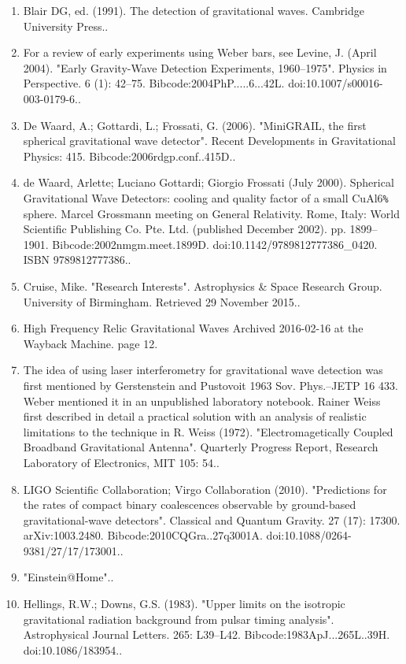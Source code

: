 \begin{enumerate}
\item Blair DG, ed. (1991). The detection of gravitational waves. Cambridge University Press..
\item For a review of early experiments using Weber bars, see Levine, J. (April 2004). "Early Gravity-Wave Detection Experiments, 1960–1975". Physics in Perspective. 6 (1): 42–75. Bibcode:2004PhP.....6...42L. doi:10.1007/s00016-003-0179-6..
\item De Waard, A.; Gottardi, L.; Frossati, G. (2006). "MiniGRAIL, the first spherical gravitational wave detector". Recent Developments in Gravitational Physics: 415. Bibcode:2006rdgp.conf..415D..
\item de Waard, Arlette; Luciano Gottardi; Giorgio Frossati (July 2000). Spherical Gravitational Wave Detectors: cooling and quality factor of a small CuAl6\verb|%| sphere. Marcel Grossmann meeting on General Relativity. Rome, Italy: World Scientific Publishing Co. Pte. Ltd. (published December 2002). pp. 1899–1901. Bibcode:2002nmgm.meet.1899D. doi:10.1142/9789812777386_0420. ISBN 9789812777386..
\item Cruise, Mike. "Research Interests". Astrophysics & Space Research Group. University of Birmingham. Retrieved 29 November 2015..
\item High Frequency Relic Gravitational Waves Archived 2016-02-16 at the Wayback Machine. page 12.
\item The idea of using laser interferometry for gravitational wave detection was first mentioned by Gerstenstein and Pustovoit 1963 Sov. Phys.–JETP 16 433. Weber mentioned it in an unpublished laboratory notebook. Rainer Weiss first described in detail a practical solution with an analysis of realistic limitations to the technique in R. Weiss (1972). "Electromagetically Coupled Broadband Gravitational Antenna". Quarterly Progress Report, Research Laboratory of Electronics, MIT 105: 54..
\item LIGO Scientific Collaboration; Virgo Collaboration (2010). "Predictions for the rates of compact binary coalescences observable by ground-based gravitational-wave detectors". Classical and Quantum Gravity. 27 (17): 17300. arXiv:1003.2480. Bibcode:2010CQGra..27q3001A. doi:10.1088/0264-9381/27/17/173001..
\item "Einstein@Home"..
\item Hellings, R.W.; Downs, G.S. (1983). "Upper limits on the isotropic gravitational radiation background from pulsar timing analysis". Astrophysical Journal Letters. 265: L39–L42. Bibcode:1983ApJ...265L..39H. doi:10.1086/183954..

\end{enumerate}
